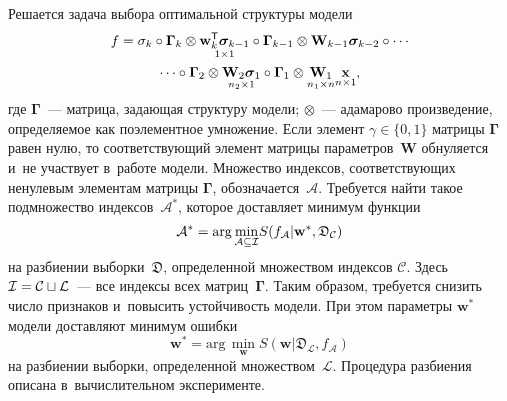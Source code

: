 \begin{multicols}{2}
Решается задача выбора оптимальной структуры модели
\begin{multline}
\label{eq57}
f = 
\sigma_k\circ\boldsymbol{\Gamma}_k\otimes\underset{1\times1}{{\mathbf{w}}_k^\mathsf{T}
{\boldsymbol{\sigma}}_{k-1}}\circ\boldsymbol{\Gamma}_{k-1}\otimes\mathbf{W}_{k-
1}{\boldsymbol{\sigma}}_{k-2}\circ\cdots\\
\cdots\circ\boldsymbol{\Gamma}_2\otimes\underset{n_2 
\times 
1}{\mathbf{W}_2{\boldsymbol{\sigma}}_1}\circ\boldsymbol{\Gamma}_1\otimes\underset{n_1 
\times n}{\mathbf{W}_1}\underset{n \times 1}{{\mathbf{x}}},
\end{multline}
где $\boldsymbol{\Gamma}$~--- матрица, за\-да\-ющая структуру модели; 
$\otimes$~--- адамарово произведение, определяемое как поэлементное 
умножение. Если элемент $\gamma\in\{0,1\}$ мат\-ри\-цы $\boldsymbol{\Gamma}$ 
равен нулю, то соответствующий элемент мат\-ри\-цы па\-ра\-мет\-ров~$\mathbf{W}$ 
обнуляется и~не участвует в~работе модели. Множество индексов, соответствующих 
ненулевым элементам матрицы $\boldsymbol{\Gamma}$, обозначается~$\mathcal{A}$.  
Требуется найти такое подмножество индексов~$\mathcal{A}^{*}$, которое 
доставляет минимум \mbox{функции}
\begin{equation}
\label{eq46}
\mathcal{A}^{*} = \mathrm{arg}\,\underset{\mathcal{A} \subseteq 
\mathcal{I}}\min S(f_{\mathcal{A}}|{\mathbf{w}}^*, \mathfrak{D}_\mathcal{C})
\end{equation}
на разбиении выборки~$\mathfrak{D}$, определенной множеством индексов 
$\mathcal{C}$. Здесь $\mathcal{I}\hm = \mathcal{C}\sqcup \mathcal{L}$~--- все 
индексы всех матриц~$\boldsymbol{\Gamma}$. Таким образом, требуется снизить число 
признаков и~повысить устойчивость модели. При этом параметры $\mathbf{w}^*$ 
модели доставляют минимум ошибки
\begin{equation}
\label{eq102}
\mathbf{w}^* = \mathrm{arg}\,\underset{\mathbf{w}}\min 
S(\mathbf{w}|\mathfrak{D}_\mathcal{L}, f_\mathcal{A})
\end{equation}
на разбиении выборки, определенной множеством~$\mathcal{L}$. Процедура 
разбиения описана в~вы\-чис\-ли\-тель\-ном эксперименте.


\end{multicols}
